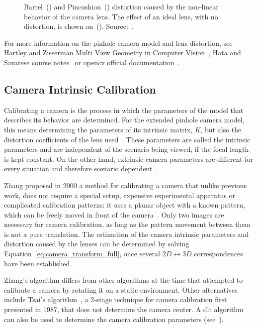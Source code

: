 \begin{figure}[!ht]
	\caption[Effects of barrel and pincushion distortion caused by a non-linear klens.]{Barrel~() and Pincushion~() distortion caused by the non-linear behavior of the camera lens. The effect of an ideal lens, with no distortion, is shown on~(). Source:~\cite{camera_models}.}
	\label{fig:lense_distortion_types}
\end{figure}

For more information on the pinhole camera model and lens distortion, see Hartley and Zisserman Multi View Geometry in Computer Vision~\cite{mvg_book}, Hata and Savarese course notes~\cite{camera_models} or \acf{opencv} official documentation~\cite{opencv_doc}. 

\subsection{Camera Intrinsic Calibration}
\label{subsec:sota:camera-intrinisc-calibration}
Calibrating a camera is the process in which the parameters of the model that describes its behavior are determined. For the extended pinhole camera model, this means determining the parameters of its intrinsic matrix, $K$, but also the distortion coefficients of the lens used~\cite{mvg_book, camera_models, Bouguet2010, Heikkila1997}. These parameters are called the intrinsic parameters and are independent of the scenario being viewed, if the focal length is kept constant. On the other hand, extrinsic camera parameters are different for every situation and therefore scenario dependent~\cite{opencv_doc, Bouguet2010, Heikkila1997}.

Zhang proposed in 2000 a method for calibrating a camera that unlike previous work, does not require a special setup, expensive experimental apparatus or complicated calibration patterns: it uses a planar object with a known pattern, which can be freely moved in front of the camera~\cite{Zhang2000}. Only two images are necessary for camera calibration, as long as the pattern movement between them is not a pure translation. The estimation of the camera intrinsic parameters and distortion caused by the lenses can be determined by solving Equation~\eqref{eq:camera_transform_full}, once several $2D \leftrightarrow 3D$ correspondences have been established.

Zhang's algorithm differs from other algorithms at the time that attempted to calibrate a camera by rotating it on a static environment. Other alternatives include Tsai's algorithm~\cite{Roger1987, mvg_book}, a 2-stage technique for camera calibration first presented in 1987, that does not determine the camera center. A \ac{dlt} algorithm can also be used to determine the camera calibration parameters (see~\cite{mvg_book}).

